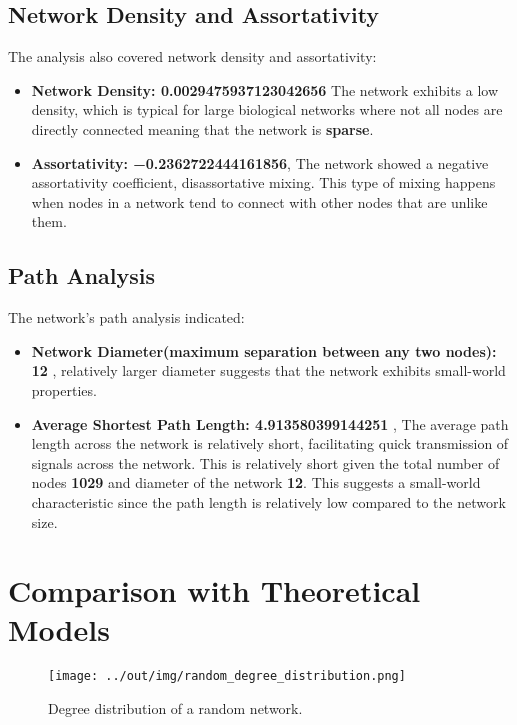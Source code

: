 \documentclass[
	report, %
	11pt, %
]{CSUniSchoolLabReport}
\begin{document}
	\subsection{Network Density and Assortativity}

	The analysis also covered network density and assortativity:
	\begin{itemize}
		\item \textbf{Network Density: \num{0.0029475937123042656}} The network exhibits a low density, which is typical for large biological networks where not all nodes are directly connected meaning that the network is \textbf{sparse}.
		\item \textbf{Assortativity: \num{-0.2362722444161856}}, The network showed a negative assortativity coefficient, disassortative mixing. This type of mixing happens when nodes in a network tend to connect with other nodes that are unlike them.
	\end{itemize}

	\subsection{Path Analysis}

	The network's path analysis indicated:
	\begin{itemize}
		\item \textbf{Network Diameter(maximum separation between any two nodes): 12} , relatively larger diameter suggests that the network exhibits small-world properties.
		\item \textbf{Average Shortest Path Length: \num{4.913580399144251}} , The average path length across the network is relatively short, facilitating quick transmission of signals across the network. This is relatively short given the total number of nodes \textbf{1029} and diameter of the network \textbf{12}. This suggests a small-world characteristic since the path length is relatively low compared to the network size.
	\end{itemize}


	\section{Comparison with Theoretical Models}

	\begin{figure}[H]
		\centering
		\captionsetup{justification=centering}
		\texttt{[image: ../out/img/random\_degree\_distribution.png]}
		\caption{Degree distribution of a random network.}
		\label{fig:random_deg_dist}
	\end{figure}
\end{document}
